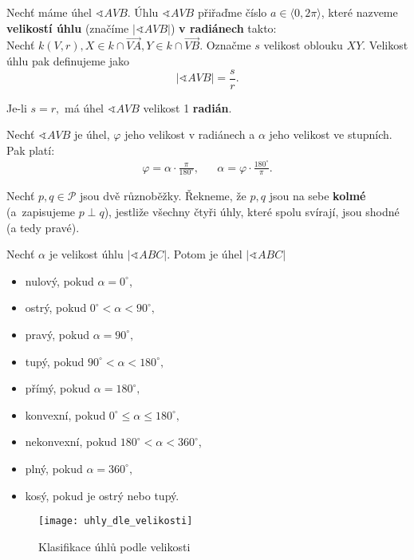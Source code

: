 \begin{definition}\label{raddef}
    Nechť máme úhel $\sphericalangle AVB$. Úhlu $\sphericalangle AVB$ přiřaďme číslo $a\in \langle 0, 2\pi \rangle$,
    které nazveme \textbf{velikostí úhlu} (značíme $|\sphericalangle AVB|$) \textbf{v radiánech} takto:\\
    Nechť $k(V,r), X\in k\cap \overrightarrow{VA}, Y\in k\cap \overrightarrow{VB}.$
    Označme $s$ velikost oblouku $XY.$ Velikost úhlu pak definujeme jako
    $$|\sphericalangle AVB| = \frac{s}{r}.$$
\end{definition}

\begin{pozn}
    Je-li $s=r,$ má úhel $\sphericalangle AVB$ velikost 1 \textbf{radián}.
\end{pozn}

\begin{veta}
    Nechť $\sphericalangle AVB$ je úhel, $\varphi$ jeho velikost v radiánech a $\alpha$
    jeho velikost ve stupních. Pak platí:
    \begin{align*}
        \varphi = \alpha\cdot \frac{\pi}{180^\circ}, & & \alpha = \varphi\cdot \frac{180^\circ}{\pi}.
    \end{align*}
\end{veta}

\begin{definition}
  Nechť $p,q\in \mathscr P$ jsou dvě různoběžky. Řekneme, že $p,q$ jsou na sebe \textbf{kolmé} (a~zapisujeme $p\perp q$), jestliže všechny čtyři úhly, které spolu svírají, jsou shodné (a tedy pravé).
\end{definition}

\begin{pozn}
  Nechť $\alpha$ je velikost úhlu $|\sphericalangle ABC|$. Potom je úhel $|\sphericalangle ABC|$
  \begin{itemize}
    \item nulový, pokud $\alpha=0^\circ$,
  \item ostrý, pokud $0^\circ <\alpha < 90^\circ,$
  \item pravý, pokud $\alpha = 90^\circ,$
  \item tupý, pokud $90^\circ < \alpha < 180^\circ,$
  \item přímý, pokud $\alpha = 180^\circ,$
  \item konvexní, pokud $0^\circ \leq \alpha \leq 180^\circ,$
  \item nekonvexní, pokud $180^\circ < \alpha < 360^\circ$,
  \item plný, pokud $\alpha = 360^\circ,$
  \item kosý, pokud je ostrý nebo tupý.
  \end{itemize}

  \begin{figure}[ht!]
    \centering
    \texttt{[image: uhly\_dle\_velikosti]}
    \caption{Klasifikace úhlů podle velikosti}
  \end{figure}
\end{pozn}

